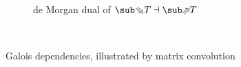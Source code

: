 \begin{figure}
\begin{subfigure}{0.46\textwidth}
      \vspace{2mm}
      \caption{de Morgan dual of $\evalBwdF{T} \adjoint \evalFwdF{T}$}
   \end{subfigure}\\
   \vspace{5mm}
   \begin{subfigure}[t]{3.3in}
      \small
      
   \end{subfigure}
   \begin{subfigure}[t]{2.1in}
      \small
      
   \end{subfigure}
   \caption{Galois dependencies, illustrated by matrix convolution}
\end{figure}

